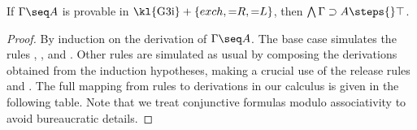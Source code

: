 \begin{theorem}
  If $\Gamma \seq A$ is provable in $\text{\kl{G3i}} + \{exch, {=}R, {=}L\}$,
  then $\bigwedge \Gamma \limp A \steps{} \top$.
\end{theorem}
\begin{proof}
  By induction on the derivation of $\Gamma \seq A$. The base case simulates the
  rules {}, {}, {} and {}. Other rules
  are simulated as usual by composing the derivations obtained from the
  induction hypotheses, making a crucial use of the release rules {}
  and {}. The full mapping from  rules to
  derivations in our  calculus is given in the following
  table. Note that we treat conjunctive formulas modulo associativity to avoid
  bureaucratic details.


\end{proof}
